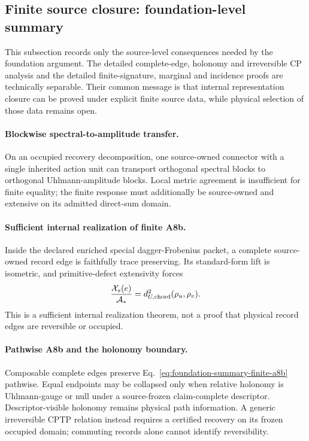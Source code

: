 \documentclass[11pt]{article}
\begin{document}
\subsection{Finite source closure: foundation-level summary}
\label{sec:a8-source-selection}

This subsection records only the source-level consequences needed by the
foundation argument.  The detailed complete-edge, holonomy and irreversible
CP analysis and the detailed finite-signature, marginal and incidence proofs
are technically separable.  Their common message is that internal
representation closure can be proved under explicit finite source data, while
physical selection of those data remains open.

\paragraph{Blockwise spectral-to-amplitude transfer.}
On an occupied recovery decomposition, one source-owned connector with a
single inherited action unit can transport orthogonal spectral blocks to
orthogonal Uhlmann-amplitude blocks.  Local metric agreement is insufficient
for finite equality; the finite response must additionally be source-owned
and extensive on its admitted direct-sum domain.

\paragraph{Sufficient internal realization of finite A8b.}
Inside the declared enriched special dagger-Frobenius packet, a complete
source-owned record edge is faithfully trace preserving.  Its standard-form
lift is isometric, and primitive-defect extensivity forces
\begin{equation}
 {\mathcal X_s(e)\over\mathcal A_*}
 =d_{U,{\rm chord}}^2(\rho_u,\rho_v).
 \label{eq:foundation-summary-finite-a8b}
\end{equation}
This is a sufficient internal realization theorem, not a proof that physical
record edges are reversible or occupied.

\paragraph{Pathwise A8b and the holonomy boundary.}
Composable complete edges preserve Eq.~\eqref{eq:foundation-summary-finite-a8b}
pathwise.  Equal endpoints may be collapsed only when relative holonomy is
Uhlmann-gauge or null under a source-frozen claim-complete descriptor.
Descriptor-visible holonomy remains physical path information.  A generic
irreversible CPTP relation instead requires a certified recovery on its frozen
occupied domain; commuting records alone cannot identify reversibility.
\end{document}
